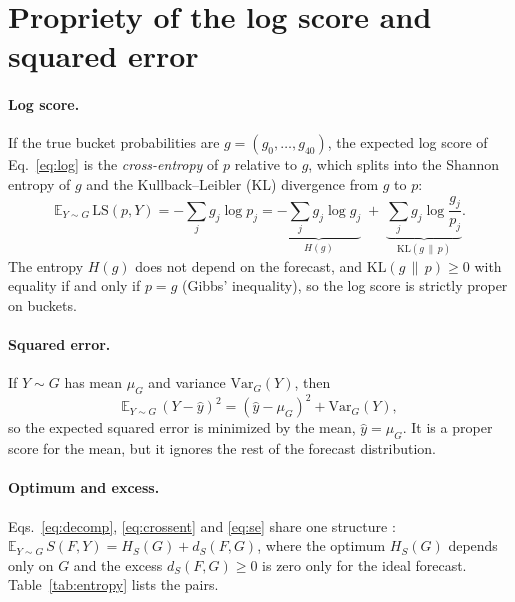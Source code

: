 \documentclass{article}
\newcommand{\1}{\mathbf{1}}
\newcommand{\E}{\mathbb{E}}
\begin{document}
\section{Propriety of the log score and squared error}\label{app:proofs}

\paragraph{Log score.} If the true bucket probabilities are $g = (g_0, \dots, g_{40})$, the expected log score of Eq.~\eqref{eq:log} is the \emph{cross-entropy} of $p$ relative to $g$, which splits into the Shannon entropy of $g$ and the Kullback--Leibler (KL) divergence from $g$ to $p$:
\begin{equation}\label{eq:crossent}
\E_{Y \sim G}\,\mathrm{LS}(p, Y) = -\sum_{j} g_j \log p_j = \underbrace{-\sum_{j} g_j \log g_j}_{H(g)} \;+\; \underbrace{\sum_{j} g_j \log \frac{g_j}{p_j}}_{\mathrm{KL}(g \,\|\, p)}.
\end{equation}
The entropy $H(g)$ does not depend on the forecast, and $\mathrm{KL}(g \,\|\, p) \ge 0$ with equality if and only if $p = g$ (Gibbs' inequality), so the log score is strictly proper on buckets.

\paragraph{Squared error.} If $Y \sim G$ has mean $\mu_G$ and variance $\mathrm{Var}_G(Y)$, then
\begin{equation}\label{eq:se}
\E_{Y \sim G}\,(Y - \hat y)^2 = (\hat y - \mu_G)^2 + \mathrm{Var}_G(Y),
\end{equation}
so the expected squared error is minimized by the mean, $\hat y = \mu_G$. It is a proper score for the mean, but it ignores the rest of the forecast distribution.

\paragraph{Optimum and excess.} Eqs.~\eqref{eq:decomp}, \eqref{eq:crossent} and \eqref{eq:se} share one structure \citep{gneiting2007}: $\E_{Y \sim G}\, S(F, Y) = H_S(G) + d_S(F, G)$, where the optimum $H_S(G)$ depends only on $G$ and the excess $d_S(F, G) \ge 0$ is zero only for the ideal forecast. Table~\ref{tab:entropy} lists the pairs.
\end{document}
